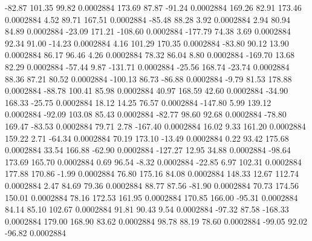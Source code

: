       -82.87      101.35       99.82     0.0002884
      173.69       87.87      -91.24     0.0002884
      169.26       82.91      173.46     0.0002884
        4.52       89.71      167.51     0.0002884
      -85.48       88.28        3.92     0.0002884
        2.94       80.94       84.89     0.0002884
      -23.09      171.21     -108.60     0.0002884
     -177.79       74.38        3.69     0.0002884
       92.34       91.00      -14.23     0.0002884
        4.16      101.29      170.35     0.0002884
      -83.80       90.12       13.90     0.0002884
       86.17       96.46        4.26     0.0002884
       78.32       86.04        8.80     0.0002884
     -169.70       13.68       82.29     0.0002884
      -57.44        9.87     -131.71     0.0002884
      -25.56      168.74      -23.74     0.0002884
       88.36       87.21       80.52     0.0002884
     -100.13       86.73      -86.88     0.0002884
       -9.79       81.53      178.88     0.0002884
      -88.78      100.41       85.98     0.0002884
       40.97      168.59       42.60     0.0002884
      -34.90      168.33      -25.75     0.0002884
       18.12       14.25       76.57     0.0002884
     -147.80        5.99      139.12     0.0002884
      -92.09      103.08       85.43     0.0002884
      -82.77       98.60       92.68     0.0002884
      -78.80      169.47      -83.53     0.0002884
       79.71        2.78     -167.40     0.0002884
       16.02        9.33      161.20     0.0002884
      159.22        2.71      -64.34     0.0002884
       70.19      173.10      -13.49     0.0002884
        0.22       93.42      175.68     0.0002884
       33.54      166.88      -62.90     0.0002884
     -127.27       12.95       34.88     0.0002884
      -98.64      173.69      165.70     0.0002884
        0.69       96.54       -8.32     0.0002884
      -22.85        6.97      102.31     0.0002884
      177.88      170.86       -1.99     0.0002884
       76.80      175.16       84.08     0.0002884
      148.33       12.67      112.74     0.0002884
        2.47       84.69       79.36     0.0002884
       88.77       87.56      -81.90     0.0002884
       70.73      174.56      150.01     0.0002884
       78.16      172.53      161.95     0.0002884
      170.85      166.00      -95.31     0.0002884
       84.14       85.10      102.67     0.0002884
       91.81       90.43        9.54     0.0002884
      -97.32       87.58     -168.33     0.0002884
      179.00      168.90       83.62     0.0002884
       98.78       88.19       78.60     0.0002884
      -99.05       92.02      -96.82     0.0002884
